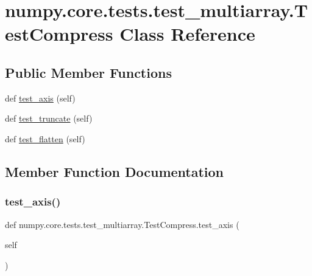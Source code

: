 \hypertarget{classnumpy_1_1core_1_1tests_1_1test__multiarray_1_1TestCompress}{}\section{numpy.\+core.\+tests.\+test\+\_\+multiarray.\+Test\+Compress Class Reference}
\label{classnumpy_1_1core_1_1tests_1_1test__multiarray_1_1TestCompress}
\subsection*{Public Member Functions}
\begin{DoxyCompactItemize}
\item 
def \hyperlink{classnumpy_1_1core_1_1tests_1_1test__multiarray_1_1TestCompress_a9a872fdb60fdb185163c63d0c70faa1c}{test\+\_\+axis} (self)
\item 
def \hyperlink{classnumpy_1_1core_1_1tests_1_1test__multiarray_1_1TestCompress_a6dafe725cb31592677a000efde66bdcd}{test\+\_\+truncate} (self)
\item 
def \hyperlink{classnumpy_1_1core_1_1tests_1_1test__multiarray_1_1TestCompress_a00841b0be6ff87a657742a2d2f2b608e}{test\+\_\+flatten} (self)
\end{DoxyCompactItemize}


\subsection{Member Function Documentation}
\mbox{\label{classnumpy_1_1core_1_1tests_1_1test__multiarray_1_1TestCompress_a9a872fdb60fdb185163c63d0c70faa1c}} 
\subsubsection{\texorpdfstring{test\+\_\+axis()}{test\_axis()}}
{\footnotesize\ttfamily def numpy.\+core.\+tests.\+test\+\_\+multiarray.\+Test\+Compress.\+test\+\_\+axis (\begin{DoxyParamCaption}\item[{}]{self }\end{DoxyParamCaption})}

